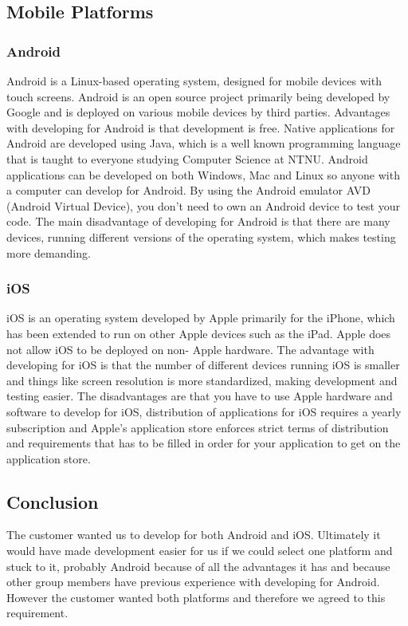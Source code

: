\subsection{Mobile Platforms}

\subsubsection*{Android}

    Android is a Linux-based operating system, designed for mobile devices with touch screens.
    Android is an open source project primarily being developed by Google and is deployed on various
    mobile devices by third parties.\cite{android} Advantages with developing for Android is that
    development is free. Native applications for Android are developed using Java, which is a well
    known programming language that is taught to everyone studying Computer Science at NTNU. Android
    applications can be developed on both Windows, Mac and Linux so anyone with a computer can
    develop for Android. By using the Android emulator AVD (Android Virtual Device), you don't need
    to own an Android device to test your code. The main disadvantage of developing for Android is
    that there are many devices, running different versions of the operating system, which makes
    testing more demanding.

\subsubsection*{iOS}

    iOS is an operating system developed by Apple primarily for the iPhone, which has been extended
    to run on other Apple devices such as the iPad. Apple does not allow iOS to be deployed on non-
    Apple hardware.\cite{ios} The advantage with developing for iOS is that the number of different
    devices running iOS is smaller and things like screen resolution is more standardized, making
    development and testing easier. The disadvantages are that you have to use Apple hardware and
    software to develop for iOS, distribution of applications for iOS requires a yearly
    subscription\cite{iosCost} and Apple's application store enforces strict terms of distribution
    and requirements that has to be filled in order for your application to get on the application
    store.

\subsection{Conclusion}

    The customer wanted us to develop for both Android and iOS.
    Ultimately it would have made development easier for us if we could select one platform and
    stuck to it, probably Android because of all the advantages it has and because other group
    members have previous experience with developing for Android. However the customer wanted both
    platforms and therefore we agreed to this requirement.
